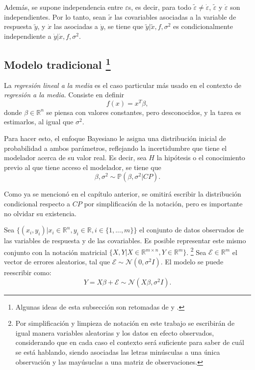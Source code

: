 Adem\'as, se supone independencia entre $\varepsilon$s, es decir, para todo $\tilde{\varepsilon} \neq \dot{\varepsilon}$, $\tilde{\varepsilon}$ y $\dot{\varepsilon}$ son independientes. Por lo tanto, sean $\tilde{x}$ las covariables asociadas a la variable de respuesta $\tilde{y}$, y $\dot{x}$ las asociadas a $\dot{y}$, se tiene que $\tilde{y} | \tilde{x}, f, \sigma^2$ es condicionalmente independiente a $\dot{y} | \dot{x}, f, \sigma^2$.

\subsection[Modelo tradicional]{
    Modelo tradicional
    \footnote{Algunas ideas de esta subsecci\'on son retomadas de \cite{Denison_BayesMethods} y \cite{Bannerjee_BayLinMod}.}
}

La \textit{regresi\'on lineal a la media} es el caso particular m\'as usado en el contexto de \textit{regresi\'on a la media}. Consiste en definir
\begin{equation*}
    f(x) = x^T\beta,
\end{equation*}
donde $\beta \in \mathbb{R}^n$ se piensa con valores constantes, pero desconocidos, y la tarea es estimarlos, al igual que $\sigma^2$.

Para hacer esto, el enfoque Bayesiano le asigna una distribución inicial de probabilidad a ambos par\'ametros, reflejando la incertidumbre que tiene el modelador acerca de su valor real. Es decir, sea $H$ la hip\'otesis o el conocimiento previo al que tiene acceso el modelador, se tiene que 
\begin{equation*}
    \beta,\sigma^2 \sim \mathbb{P}(\beta,\sigma^2|CP).
\end{equation*}

Como ya se mencion\'o en el cap\'itulo anterior, se omitir\'a escribir la distribuci\'on condicional respecto a $CP$ por simplificaci\'on de la notaci\'on, pero es importante no olvidar su existencia.

Sea $\{(x_i,y_i)| x_i \in \mathbb{R}^n, y_i \in \mathbb{R}, i \in \{1,...,m\} \}$ el conjunto de datos observados de las variables de respuesta y de las covariables. Es posible representar este mismo conjunto con la notaci\'on matricial $\{X,Y | X \in \mathbb{R}^{m \times n}, Y \in \mathbb{R}^m\}$. \footnote{Por simplificaci\'on y limpieza de notaci\'on en este trabajo se escribir\'an de igual manera variables aleatorias y los datos en efecto observados, considerando que en cada caso el contexto ser\'a suficiente para saber de cu\'al se est\'a hablando, siendo asociadas las letras min\'usculas a una \'unica observaci\'on y las may\'usuclas a una matriz de observaciones.} Sea $\mathcal{E} \in \mathbb{R}^m$ el vector de errores aleatorios, tal que $\mathcal{E} \sim \mathcal{N}(0,\sigma^2 I)$. El modelo se puede reescribir como:
\begin{equation*}
    Y = X\beta + \mathcal{E} \sim \mathcal{N}(X\beta,\sigma^2 I).
\end{equation*}


